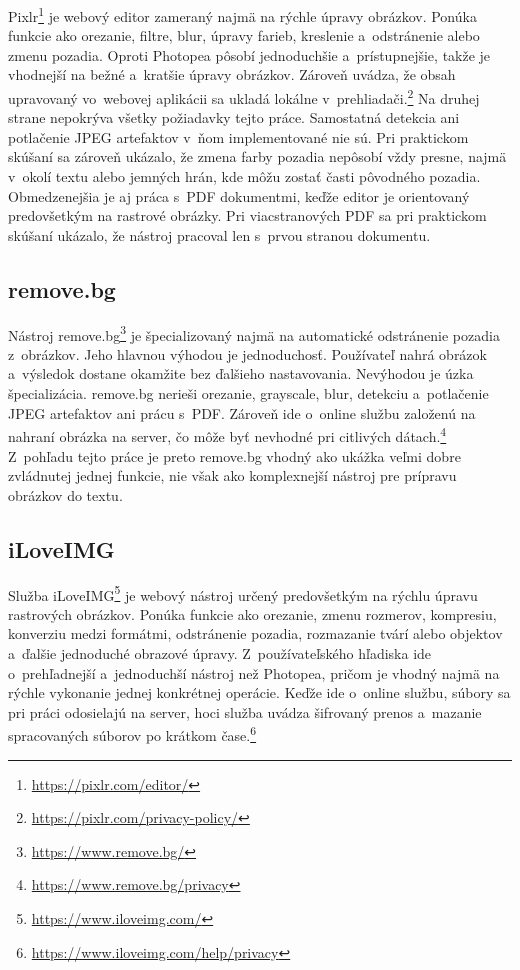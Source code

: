 Pixlr\footnote{\url{https://pixlr.com/editor/}} je webový editor zameraný najmä na rýchle úpravy obrázkov. Ponúka funkcie ako orezanie, filtre, blur, úpravy farieb, kreslenie a~odstránenie alebo zmenu pozadia. Oproti Photopea pôsobí jednoduchšie a~prístupnejšie, takže je vhodnejší na bežné a~kratšie úpravy obrázkov. Zároveň uvádza, že obsah upravovaný vo~webovej aplikácii sa ukladá lokálne v~prehliadači.\footnote{\url{https://pixlr.com/privacy-policy/}} Na druhej strane nepokrýva všetky požiadavky tejto práce. Samostatná detekcia ani potlačenie JPEG artefaktov v~ňom implementované nie sú. Pri praktickom skúšaní sa zároveň ukázalo, že zmena farby pozadia nepôsobí vždy presne, najmä v~okolí textu alebo jemných hrán, kde môžu zostať časti pôvodného pozadia. Obmedzenejšia je aj práca s~PDF dokumentmi, keďže editor je orientovaný predovšetkým na rastrové obrázky. Pri viacstranových PDF sa pri praktickom skúšaní ukázalo, že nástroj pracoval len s~prvou stranou dokumentu.

\subsection{remove.bg}

Nástroj remove.bg\footnote{\url{https://www.remove.bg/}} je špecializovaný najmä na automatické odstránenie pozadia z~obrázkov. Jeho hlavnou výhodou je jednoduchosť. Používateľ nahrá obrázok a~výsledok dostane okamžite bez ďalšieho nastavovania. Nevýhodou je úzka špecializácia. remove.bg nerieši orezanie, grayscale, blur, detekciu a~potlačenie JPEG artefaktov ani prácu s~PDF. Zároveň ide o~online službu založenú na nahraní obrázka na server, čo môže byť nevhodné pri citlivých dátach.\footnote{\url{https://www.remove.bg/privacy}} Z~pohľadu tejto práce je preto remove.bg vhodný ako ukážka veľmi dobre zvládnutej jednej funkcie, nie však ako komplexnejší nástroj pre prípravu obrázkov do textu.

\subsection{iLoveIMG}

Služba iLoveIMG\footnote{\url{https://www.iloveimg.com/}} je webový nástroj určený predovšetkým na rýchlu úpravu rastrových obrázkov. Ponúka funkcie ako orezanie, zmenu rozmerov, kompresiu, konverziu medzi formátmi, odstránenie pozadia, rozmazanie tvárí alebo objektov a~ďalšie jednoduché obrazové úpravy. Z~používateľského hľadiska ide o~prehľadnejší a~jednoduchší nástroj než Photopea, pričom je vhodný najmä na rýchle vykonanie jednej konkrétnej operácie. Keďže ide o~online službu, súbory sa pri práci odosielajú na server, hoci služba uvádza šifrovaný prenos a~mazanie spracovaných súborov po krátkom čase.\footnote{\url{https://www.iloveimg.com/help/privacy}}

